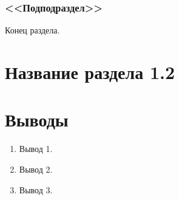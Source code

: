 \subsubsection{<<Подподраздел>>} \label{subsect1_1_1_1}

Конец раздела.\label{sect1_1-eof}


\section{Название раздела 1.2} \label{sect1_2}


\section{Выводы} \label{sect1_3}

\begin{enumerate}
\item Вывод 1.
\item Вывод 2.
\item Вывод 3.
\end{enumerate}

